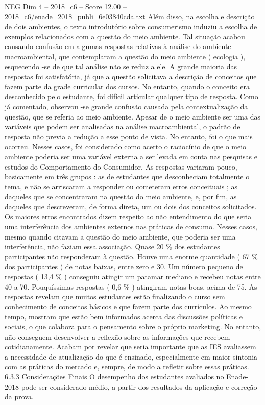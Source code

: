 \begin{textsample}{NEG Dim 4 – 2018\_c6 – Score 12.00 – 2018\_c6/enade\_2018\_publi\_6e03840cda.txt}
Além disso, na escolha e descrição de dois ambientes, o texto introdutório sobre consumerismo induziu a escolha de exemplos relacionados com a questão do meio ambiente.
Tal situação acabou causando confusão em algumas respostas relativas à análise do ambiente macroambiental, que contemplaram a questão do meio ambiente ( ecologia ), esquecendo -se de que tal análise não se reduz a ele.
A grande maioria das respostas foi satisfatória, já que a questão solicitava a descrição de conceitos que fazem parte da grade curricular dos cursos.
No entanto, quando o conceito era desconhecido pelo estudante, foi difícil articular qualquer tipo de resposta.
Como já comentado, observou -se grande confusão causada pela contextualização da questão, que se referia ao meio ambiente.
Apesar de o meio ambiente ser uma das variáveis que podem ser analisadas na análise macroambiental, o padrão de resposta não previa a redução a esse ponto de vista.
No entanto, foi o que mais ocorreu.
Nesses casos, foi considerado como acerto o raciocínio de que o meio ambiente poderia ser uma variável externa a ser levada em conta nas pesquisas e estudos do Comportamento do Consumidor.
As respostas variaram pouco, basicamente em três grupos : as de estudantes que desconheciam totalmente o tema, e não se arriscaram a responder ou cometeram erros conceituais ; as daqueles que se concentraram na questão do meio ambiente, e, por fim, as daqueles que descreveram, de forma direta, um ou dois dos conceitos solicitados.
Os maiores erros encontrados dizem respeito ao não entendimento do que seria uma interferência dos ambientes externos nas práticas de consumo.
Nesses casos, mesmo quando citavam a questão do meio ambiente, que poderia ser uma interferência, não faziam essa associação.
Quase 20 \% dos estudantes participantes não responderam à questão.
Houve uma enorme quantidade ( 67 \% dos participantes ) de notas baixas, entre zero e 30.
Um número pequeno de respostas ( 13,4 \% ) conseguiu atingir um patamar mediano e recebeu notas entre 40 a 70.
Pouquíssimas respostas ( 0,6 \% ) atingiram notas boas, acima de 75.
As respostas revelam que muitos estudantes estão finalizando o curso sem conhecimento de conceitos básicos e que fazem parte dos currículos.
Ao mesmo tempo, mostram que estão bem informados acerca das discussões políticas e sociais, o que colabora para o pensamento sobre o próprio marketing.
No entanto, não conseguem desenvolver a reflexão sobre as informações que recebem cotidianamente.
Acabam por revelar que seria importante que as IES avaliassem a necessidade de atualização do que é ensinado, especialmente em maior sintonia com as práticas do mercado e, sempre, de modo a refletir sobre essas práticas. 6.3.3 Considerações Finais O desempenho dos estudantes avaliados no Enade-2018 pode ser considerado médio, a partir dos resultados da aplicação e correção da prova.

\end{textsample}
